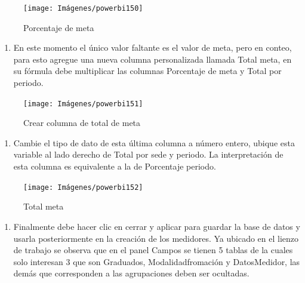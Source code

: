 \documentclass[
]{book}
\providecommand{\tightlist}{%
  \setlength{\itemsep}{0pt}\setlength{\parskip}{0pt}}
\begin{document}
\begin{figure}

{\centering \texttt{[image: Imágenes/powerbi150]} 

}

\caption{Porcentaje de meta}\label{fig:porccentajedemetaenlabase-fig}
\end{figure}

\begin{enumerate}
\def\labelenumi{\arabic{enumi}.}
\setcounter{enumi}{19}
\tightlist
\item
  En este momento el único valor faltante es el valor de meta, pero en conteo, para esto agregue una nueva columna personalizada llamada Total meta, en su fórmula debe multiplicar las columnas Porcentaje de meta y Total por periodo.
\end{enumerate}

\begin{figure}

{\centering \texttt{[image: Imágenes/powerbi151]} 

}

\caption{Crear columna de total de meta}\label{fig:totaldemeta-fig}
\end{figure}

\begin{enumerate}
\def\labelenumi{\arabic{enumi}.}
\setcounter{enumi}{20}
\tightlist
\item
  Cambie el tipo de dato de esta última columna a número entero, ubique esta variable al lado derecho de Total por sede y periodo. La interpretación de esta columna es equivalente a la de Porcentaje periodo.
\end{enumerate}

\begin{figure}

{\centering \texttt{[image: Imágenes/powerbi152]} 

}

\caption{Total meta}\label{fig:totaldemetaenlabasededatos-fig}
\end{figure}

\begin{enumerate}
\def\labelenumi{\arabic{enumi}.}
\setcounter{enumi}{21}
\tightlist
\item
  Finalmente debe hacer clic en cerrar y aplicar para guardar la base de datos y usarla posteriormente en la creación de los medidores. Ya ubicado en el lienzo de trabajo se observa que en el panel Campos se tienen 5 tablas de la cuales solo interesan 3 que son Graduados, Modalidadfromación y DatosMedidor, las demás que corresponden a las agrupaciones deben ser ocultadas.
\end{enumerate}
\end{document}
